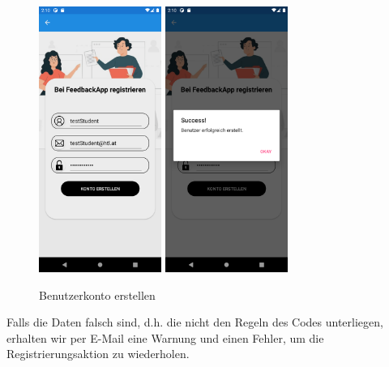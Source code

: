 \begin{figure}[h]
    \begin{center}
        \includegraphics[width=4cm]{pics/Xamarin Student/3 Registration Page Full.png}\hfill
        \includegraphics[width=4cm]{pics/Xamarin Student/4 Registration Page Success.png}
        \caption[Registrierung]{Benutzerkonto erstellen}
    \end{center}
\end{figure}
Falls die Daten falsch sind, d.h. die nicht den Regeln des Codes unterliegen, erhalten wir per E-Mail eine Warnung und einen Fehler, um die Registrierungsaktion zu wiederholen.
\newpage

